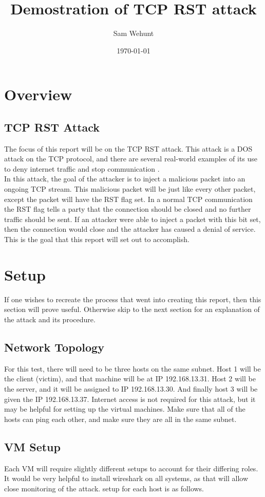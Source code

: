 \documentclass{article}
\author{Sam Wehunt\vspace{-10ex}}
\date{\today}
\title{Demostration of TCP RST attack\vspace{-10ex}}
\begin{document}
\maketitle

\section{Overview}
\subsection{TCP RST Attack}
The focus of this report will be on the TCP RST attack. 
This attack is a DOS attack on the TCP protocol, and there are several
real-world examples of its use to deny internet traffic and stop communication
\cite{Comcast}. \\
In this attack, the goal of the attacker is to inject a malicious packet into
an ongoing TCP stream. This malicious packet will be just like every other 
packet, except the packet will have the RST flag set. In a normal TCP communication
the RST flag tells a party that the connection should be closed and no further
traffic should be sent. If an attacker were able to inject a packet with this bit set,
then the connection would close and the attacker has caused a denial of service.
This is the goal that this report will set out to accomplish.

\section{Setup}
If one wishes to recreate the process that went into creating this report, then
this section will prove useful. Otherwise skip to the next section for an
explanation of the attack and its procedure.

\subsection{Network Topology}
For this test, there will need to be three hosts on the same subnet. Host 1 will
be the client (victim), and that machine will be at IP 192.168.13.31. Host 2
will be the server, and it will be assigned to IP 192.168.13.30. And finally
host 3 will be given the IP 192.168.13.37. Internet access is not required
for this attack, but it may be helpful for setting up the virtual machines.
Make sure that all of the hosts can ping each other, and make sure they are
all in the same subnet.

\subsection{VM Setup}
Each VM will require slightly different setups to account for their differing
roles. It would be very helpful to install wireshark on all systems, as that 
will allow close monitoring of the attack. setup for each host is as follows.
\end{document}
